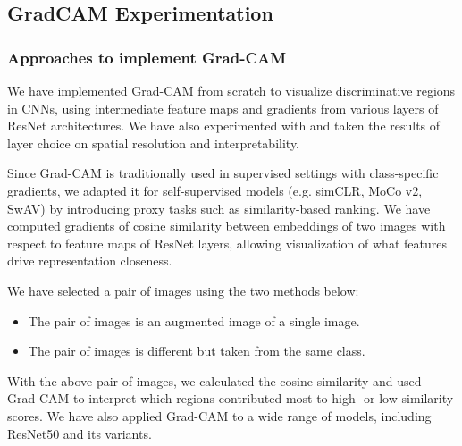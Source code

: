 \subsection{GradCAM Experimentation}
\subsubsection{Approaches to implement Grad-CAM}
We have implemented Grad-CAM from scratch to visualize discriminative regions in CNNs, using intermediate feature maps and gradients from various layers of ResNet architectures. We have also experimented with and taken the results of layer choice on spatial resolution and interpretability.

Since Grad-CAM is traditionally used in supervised settings with class-specific gradients, we adapted it for self-supervised models (e.g. simCLR, MoCo v2, SwAV) by introducing proxy tasks such as similarity-based ranking. We have computed gradients of cosine similarity between embeddings of two images with respect to feature maps of ResNet layers, allowing visualization of what features drive representation closeness.

We have selected a pair of images using the two methods below:
\begin{itemize}
    \item The pair of images is an augmented image of a single image.
    \item The pair of images is different but taken from the same class.
\end{itemize}

With the above pair of images, we calculated the cosine similarity and used Grad-CAM to interpret which regions contributed most to high- or low-similarity scores. We have also applied Grad-CAM to a wide range of models, including ResNet50 and its variants.

